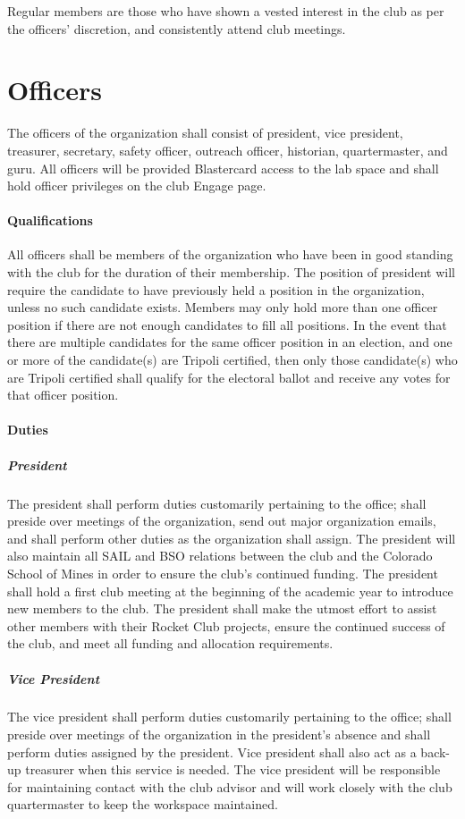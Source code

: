 \documentclass[12pt]{article}
\begin{document}
Regular members are those who have shown a vested interest in the club as per the officers' discretion, 
and consistently attend club meetings. 
\section{Officers}
\label{officers}
The officers of the organization shall consist of president, 
vice president, 
treasurer,
secretary, 
safety officer, 
outreach officer, 
historian, 
quartermaster, 
and guru. 
All officers will be provided Blastercard access to the lab space and shall hold officer privileges on the club Engage page.

\paragraph{Qualifications}
All officers shall be members of the organization who have been in good standing with the club for the duration of their membership.  
The position of president will require the candidate to have previously held a position in the organization, 
unless no such candidate exists. 
Members may only hold more than one officer position if there are not enough candidates to fill all positions. 
In the event that there are multiple candidates for the same officer position in an election, 
and one or more of the candidate(s) are Tripoli certified, 
then only those candidate(s) who are Tripoli certified shall qualify for the electoral ballot and receive any votes for that officer position.

\paragraph{Duties}
\subparagraph{President} The president shall perform duties customarily pertaining to the office; 
shall preside over meetings of the organization, 
send out major organization emails, 
and shall perform other duties as the organization shall assign.  
The president will also maintain all SAIL and BSO relations between the club and the Colorado School of Mines in order to ensure the club's continued funding. 
The president shall hold a first club meeting at the beginning of the academic year to introduce new members to the club. 
The president shall make the utmost effort to assist other members with their Rocket Club projects, 
ensure the continued success of the club, and meet all funding and allocation requirements.

\subparagraph{Vice President} The vice president shall perform duties customarily pertaining to the office; 
shall preside over meetings of the organization in the president's absence and shall perform duties assigned by the president. 
Vice president shall also act as a back-up treasurer when this service is needed. 
The vice president will be responsible for maintaining contact with the club advisor and will work closely with the club quartermaster to keep the workspace maintained. 
\end{document}

